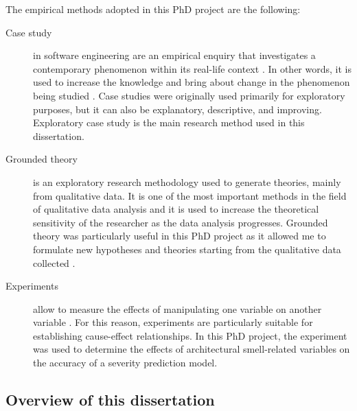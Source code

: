 The empirical methods adopted in this PhD project are the following:
\begin{description}
    \item[Case study] in software engineering are an empirical enquiry that investigates a contemporary phenomenon within its real-life context \cite{Yin2003}. In other words, it is used to increase the knowledge and bring about change in the phenomenon being studied \cite{Runeson2012}. Case studies were originally used primarily for exploratory purposes, but it can also be explanatory, descriptive, and improving.
    Exploratory case study is the main research method used in this dissertation.
    
    \item[Grounded theory] is an exploratory research methodology used to generate theories, mainly from qualitative data. It is one of the most important methods in the field of qualitative data analysis and it is used to increase the theoretical sensitivity of the researcher as the data analysis progresses. Grounded theory was particularly useful in this PhD project as it allowed me to formulate new hypotheses and theories starting from the qualitative data collected \cite{Glaser1968}.
    
    \item[Experiments] allow to measure the effects of manipulating one variable on another variable \cite{Runeson2012}. For this reason, experiments are particularly suitable for establishing cause-effect relationships.
    In this PhD project, the experiment was used to determine the effects of architectural smell-related variables on the accuracy of a severity prediction model.
    
\end{description}

\subsection{Overview of this dissertation}

